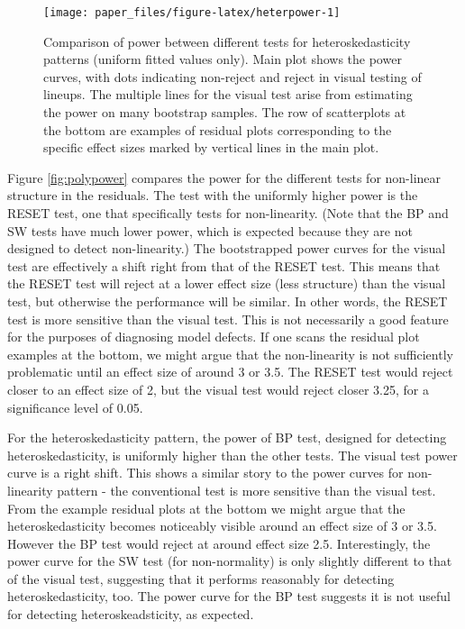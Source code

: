 \documentclass[]{interact}
\theoremstyle{plain}%
\theoremstyle{definition}
\theoremstyle{remark}
\begin{document}
\begin{figure}

{\centering \texttt{[image: paper\_files/figure-latex/heterpower-1]} 

}

\caption{Comparison of power between different tests for heteroskedasticity patterns (uniform fitted values only). Main plot shows the power curves, with dots indicating non-reject and reject in visual testing of lineups. The multiple lines for the visual test arise from estimating the power on many bootstrap samples. The row of scatterplots at the bottom are examples of residual plots corresponding to the specific effect sizes marked by vertical lines in the main plot.}\label{fig:heterpower}
\end{figure}

Figure \ref{fig:polypower} compares the power for the different tests
for non-linear structure in the residuals. The test with the uniformly
higher power is the RESET test, one that specifically tests for
non-linearity. (Note that the BP and SW tests have much lower power,
which is expected because they are not designed to detect
non-linearity.) The bootstrapped power curves for the visual test are
effectively a shift right from that of the RESET test. This means that
the RESET test will reject at a lower effect size (less structure) than
the visual test, but otherwise the performance will be similar. In other
words, the RESET test is more sensitive than the visual test. This is
not necessarily a good feature for the purposes of diagnosing model
defects. If one scans the residual plot examples at the bottom, we might
argue that the non-linearity is not sufficiently problematic until an
effect size of around 3 or 3.5. The RESET test would reject closer to an
effect size of 2, but the visual test would reject closer 3.25, for a
significance level of 0.05.

For the heteroskedasticity pattern, the power of BP test, designed for
detecting heteroskedasticity, is uniformly higher than the other tests.
The visual test power curve is a right shift. This shows a similar story
to the power curves for non-linearity pattern - the conventional test is
more sensitive than the visual test. From the example residual plots at
the bottom we might argue that the heteroskedasticity becomes noticeably
visible around an effect size of 3 or 3.5. However the BP test would
reject at around effect size 2.5. Interestingly, the power curve for the
SW test (for non-normality) is only slightly different to that of the
visual test, suggesting that it performs reasonably for detecting
heteroskedasticity, too. The power curve for the BP test suggests it is
not useful for detecting heteroskeadsticity, as expected.
\end{document}
